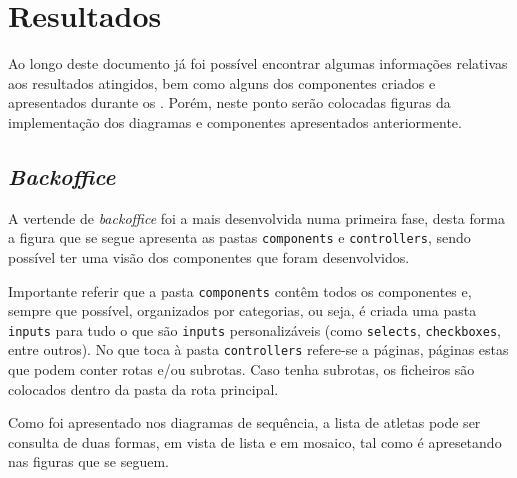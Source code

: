\chapter{Resultados}

Ao longo deste documento já foi possível encontrar algumas informações relativas aos resultados atingidos, bem como alguns dos componentes criados e apresentados durante os . Porém, neste ponto serão colocadas figuras da implementação dos diagramas e componentes apresentados anteriormente.

\section{\textit{Backoffice}}

A vertende de \textit{backoffice} foi a mais desenvolvida numa primeira fase, desta forma a figura que se segue apresenta as pastas \texttt{components} e \texttt{controllers}, sendo possível ter uma visão dos componentes que foram desenvolvidos.

Importante referir que a pasta \texttt{components} contêm todos os componentes e, sempre que possível, organizados por categorias, ou seja, é criada uma pasta \texttt{inputs} para tudo o que são \texttt{inputs} personalizáveis (como \texttt{selects}, \texttt{checkboxes}, entre outros). No que toca à pasta \texttt{controllers} refere-se a páginas, páginas estas que podem conter rotas e/ou subrotas. Caso tenha subrotas, os ficheiros são colocados dentro da pasta da rota principal.

\clearpage

\begin{minipage}[t]{0.45\textwidth}
\end{minipage}
\begin{minipage}[t]{0.45\textwidth}
\end{minipage}

Como foi apresentado nos diagramas de sequência, a lista de atletas pode ser consulta de duas formas, em vista de lista e em mosaico, tal como é apresetando nas figuras que se seguem.

\begin{minipage}[t]{0.45\textwidth}
\end{minipage}
\begin{minipage}[t]{0.45\textwidth}
\end{minipage}


